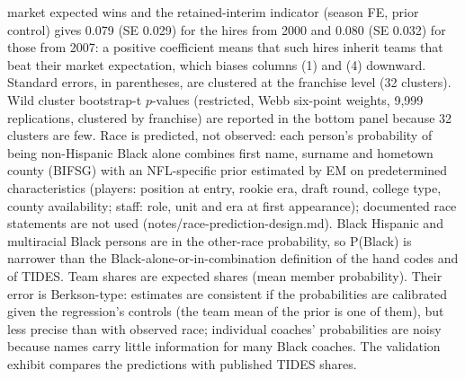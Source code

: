 {market expected wins and the retained-interim indicator (season FE, prior control) gives 0.079 (SE 0.029) for the hires from 2000 and 0.080 (SE 0.032) for those from 2007: a positive coefficient means that such hires inherit teams that beat their market expectation, which biases columns (1) and (4) downward. Standard errors, in parentheses, are clustered at the franchise level (32 clusters). Wild cluster bootstrap-t $p$-values (restricted, Webb six-point weights, 9,999 replications, clustered by franchise) are reported in the bottom panel because 32 clusters are few. Race is predicted, not observed: each person's probability of being non-Hispanic Black alone combines first name, surname and hometown county (BIFSG) with an NFL-specific prior estimated by EM on predetermined characteristics (players: position at entry, rookie era, draft round, college type, county availability; staff: role, unit and era at first appearance); documented race statements are not used (notes/race-prediction-design.md). Black Hispanic and multiracial Black persons are in the other-race probability, so P(Black) is narrower than the Black-alone-or-in-combination definition of the hand codes and of TIDES. Team shares are expected shares (mean member probability). Their error is Berkson-type: estimates are consistent if the probabilities are calibrated given the regression's controls (the team mean of the prior is one of them), but less precise than with observed race; individual coaches' probabilities are noisy because names carry little information for many Black coaches. The validation exhibit compares the predictions with published TIDES shares.
\par}

